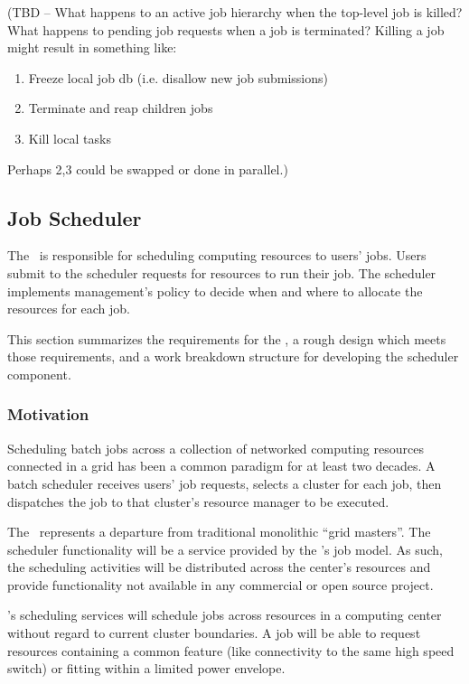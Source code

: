 (TBD -- What happens to an active job hierarchy when the top-level job
is killed?  What happens to pending job requests when a job is
terminated?  Killing a job might result in something like:

\begin{enumerate}
\item Freeze local job db (i.e. disallow new job submissions)
\item Terminate and reap children jobs
\item Kill local tasks
\end{enumerate}

Perhaps 2,3 could be swapped or done in parallel.)

\subsection{Job Scheduler}

The \ngjs\ is responsible for scheduling computing resources to users'
jobs.  Users submit to the scheduler requests for resources to run
their job.  The scheduler implements management's policy to decide
when and where to allocate the resources for each job.

This section summarizes the requirements for the \ngjs, a rough design
which meets those requirements, and a work breakdown structure for
developing the scheduler component.

\subsubsection{Motivation}

Scheduling batch jobs across a collection of networked computing
resources connected in a grid has been a common paradigm for at least
two decades.  A batch scheduler receives users' job requests, selects
a cluster for each job, then dispatches the job to that cluster's
resource manager to be executed.

The \ngjs\ represents a departure from traditional monolithic ``grid
masters''.  The scheduler functionality will be a service provided by
the \ngrm's job model.  As such, the scheduling activities will be
distributed across the center's resources and provide functionality
not available in any commercial or open source project.

\ngjs's scheduling services will schedule jobs across resources in a
computing center without regard to current cluster boundaries.  A job
will be able to request resources containing a common feature (like
connectivity to the same high speed switch) or fitting within a
limited power envelope.

